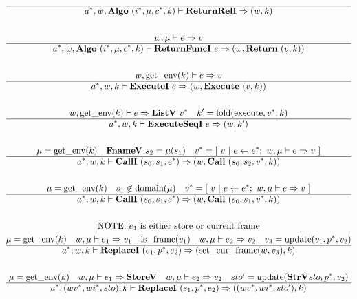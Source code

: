 \begin{gather*}
  \hline
  \seq{a}, w, \algo~ (\seq{i}, \mu, \seq c, k) \vdash \returnreli \Rightarrow (w, k) \\
%
\newline \\
  w, \mu \vdash e \Rightarrow v \\
  \hline
  \seq{a}, w, \algo ~ (\seq{i}, \mu, \seq c, k) \vdash \returnfunci ~ e \Rightarrow (w, \ret ~ (v, k)) \\
%
\newline \\
  w, \getenv(k) \vdash e \Rightarrow v \\
  \hline
  \seq{a}, w, k \vdash \executei ~ e \Rightarrow (w, \exe ~ (v, k)) \\
%
\newline \\
  w, \getenv(k) \vdash e \Rightarrow \listv ~ \seq v \quad
  k' = \fold(\execute, \seq v, k) \\
  \hline
  \seq{a}, w, k \vdash \executeseqi ~ e \Rightarrow (w, k') \\
%
\newline \\
  \mu = \getenv(k) \quad
  \fnamev ~ s_2 = \mu(s_1) \quad
  \seq{v} = [ ~ v ~ | ~ e \leftarrow \seq{e}; ~ w, \mu \vdash e \Rightarrow v ~ ] \\
  \hline
  \seq{a}, w, k \vdash \calli ~ (s_0, s_1, \seq e) \Rightarrow (w, \call ~ (s_0, s_2, \seq v, k)) \\
%
\newline \\
  \mu = \getenv(k) \quad
  s_1 \not\in \domain(\mu) \quad
  \seq{v} = [ ~ v ~ | ~ e \leftarrow \seq{e}; ~ w, \mu \vdash e \Rightarrow v ~ ] \\
  \hline
  \seq{a}, w, k \vdash \calli ~ (s_0, s_1, \seq e) \Rightarrow (w, \call ~ (s_0, s_1, \seq v, k)) \\
%
\newline \\
\text{NOTE: $e_1$ is either store or current frame} \\
  \mu = \getenv(k) \quad
  w, \mu \vdash e_1 \Rightarrow v_1 \quad
  \isframe(v_1) \quad
  w, \mu \vdash e_2 \Rightarrow v_2 \quad
  v_3 = \update(v_1, \seq p, v_2) \\
  \hline
  \seq{a}, w, k \vdash \replacei ~ (e_1, \seq{p}, e_2) \Rightarrow (\setcurframe(w, v_3), k) \\
%
\newline \\
  \mu = \getenv(k) \quad
  w, \mu \vdash e_1 \Rightarrow \storev \quad
  w, \mu \vdash e_2 \Rightarrow v_2 \quad
  sto' = \update(\strv sto, \seq p, v_2) \\
  \hline
  \seq{a}, (\seq{wv}, \seq{wi}, sto), k \vdash \replacei ~ (e_1, \seq{p}, e_2)
  \Rightarrow ((\seq{wv}, \seq{wi}, sto'), k) \\
\end{gather*}

